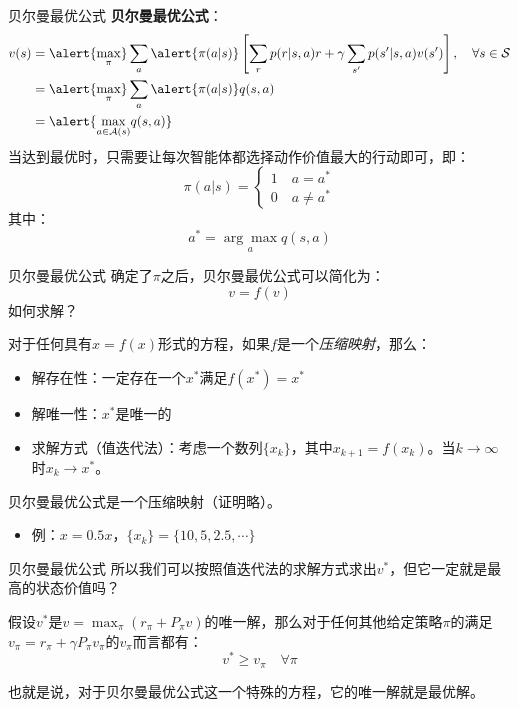 \begin{frame}{贝尔曼最优公式}
    \textbf{贝尔曼最优公式}：
    \[
        \begin{aligned}
            v(s)&=\alert{\underset{\pi}{\max}}\sum_a\alert{\pi(a|s)}\left[\sum_r p(r|s,a)r+\gamma\sum_{s'}p(s'|s,a)v(s')\right], \quad \forall s\in\mathcal{S} \\
            &=\alert{\underset{\pi}{\max}}\sum_a\alert{\pi(a|s)}q(s,a) \\
            &=\alert{\underset{a\in\mathcal{A}(s)}{\max}q(s,a)}
        \end{aligned}
    \]
    当达到最优时，只需要让每次智能体都选择动作价值最大的行动即可，即：
    \[
        \pi(a|s)=
        \begin{cases}
            1 \quad a=a^* \\
            0 \quad a\neq a^*
        \end{cases}
    \]
    其中：
    \[
        a^*=\underset{a}{\arg\max} q(s,a)
    \]
\end{frame}

\begin{frame}{贝尔曼最优公式}
    确定了$\pi$之后，贝尔曼最优公式可以简化为：
    \[
        v=f(v)
    \]
    如何求解？
    \begin{theorem}[压缩映射定理]
        对于任何具有$x=f(x)$形式的方程，如果$f$是一个\textit{压缩映射}，那么：
        \begin{itemize}
            \item 解存在性：一定存在一个$x^*$满足$f(x^*)=x^*$
            \item 解唯一性：$x^*$是唯一的
            \item 求解方式（值迭代法）：考虑一个数列$\{x_k\}$，其中$x_{k+1}=f(x_k)$。当$k\rightarrow\infty$时$x_k\rightarrow x^*$。
        \end{itemize}
    \end{theorem}
    贝尔曼最优公式是一个压缩映射（证明略）。
    \begin{itemize}
        \item 例：$x=0.5x$，$\{x_k\}=\{10, 5, 2.5,\cdots\}$
    \end{itemize}
\end{frame}

\begin{frame}{贝尔曼最优公式}
    所以我们可以按照值迭代法的求解方式求出$v^*$，但它一定就是最高的状态价值吗？
    \begin{theorem}[贝尔曼最优定理]
        假设$v^*$是$v=\max_\pi(r_\pi+P_\pi v)$的唯一解，那么对于任何其他给定策略$\pi$的满足$v_\pi=r_\pi+\gamma P_\pi v_\pi$的$v_\pi$而言都有：
        \[
            v^*\geq v_\pi \quad \forall \pi
        \]
    \end{theorem}
    也就是说，对于贝尔曼最优公式这一个特殊的方程，\alert{它的唯一解就是最优解。}
\end{frame}

